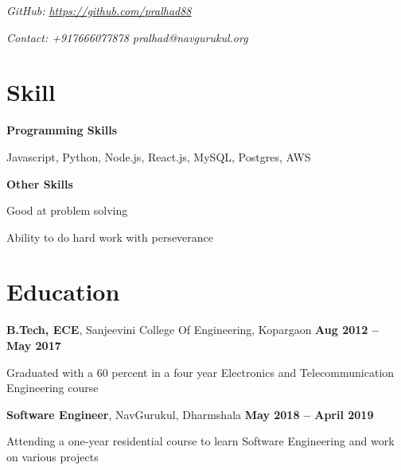 \documentclass[margin,line]{resume}
\begin{document}
\begin{resume}
    \hfill \textsl{GitHub: \url{https://github.com/pralhad88}} 

    \hfill \textsl{Contact: +917666077878 pralhad@navgurukul.org}
    \section{ \color{red} \mysidestyle Skill}
    \textbf{Programming Skills}
    \begin{list2}
        \item Javascript, Python, Node.js, React.js, MySQL, Postgres, AWS
    \end{list2}\vspace{-1.5mm}
    
    \textbf{Other Skills}
    \begin{list2}
        \item Good at problem solving
        \item Ability to do hard work with perseverance
    \end{list2}\vspace{-1.5mm}

    \section { \color{red} \mysidestyle Education}

    \textbf{B.Tech, ECE}, Sanjeevini College Of Engineering, Kopargaon \hfill \textbf{Aug 2012 -- May 2017}
    \begin{list2}
        \item Graduated with a 60 percent in a four year Electronics and Telecommunication Engineering course
    \end{list2}\vspace{-1.5mm}

    \textbf{Software Engineer}, NavGurukul, Dharmshala \hfill \textbf{May 2018 -- April 2019}
    \begin{list2}
        \item Attending a one-year residential course to learn Software Engineering and work on various projects
    \end{list2}\vspace{-1.5mm}


\end{resume}
\end{document}
